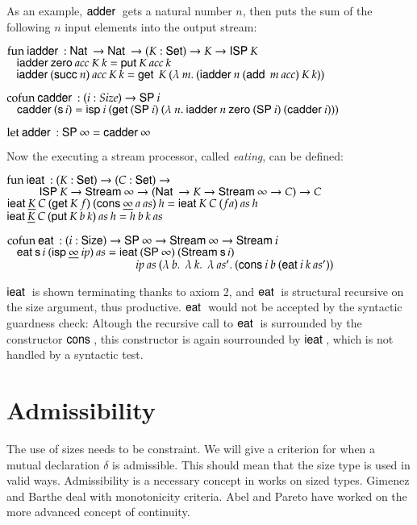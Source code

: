 As an example, $\mathsf{adder}\:$ gets a natural number $n$, 
then puts the sum of the following $n$ input elements into the output stream:
\begin{bsp}
$\mathrm{fun}\: \mathsf{iadder}\: : \mathsf{Nat}\: \rightarrow \mathsf{Nat}\: \rightarrow (K : \mathsf{Set} ) \rightarrow K \rightarrow \mathsf{ISP}\: K$\\
$\hspace*{3mm} \mathsf{iadder}\: \mathsf{zero}\: acc \: K \: k = \mathsf{put}\: K \: acc \: k$\\
$\hspace*{3mm} \mathsf{iadder}\: (\mathsf{succ}\: n) \: acc \: K \: k = \mathsf{get}\: \: K \: (\lambda\: m .\: (\mathsf{iadder}\: n \: (\mathsf{add}\: \: m \: acc) \: K \: k))$

$\mathrm{cofun}\: \mathsf{cadder}\: : (i : Size ) \rightarrow \mathsf{SP}\: i$\\
$\hspace*{3mm} \mathsf{cadder}\: (\mathsf{s}\, i) = \mathsf{isp}\: i \: (\mathsf{get}\: (\mathsf{SP}\: i) \: (\lambda\: n .\: \mathsf{iadder}\: n \: \mathsf{zero}\: (\mathsf{SP}\: i) \: (\mathsf{cadder}\: i)))$

$\mathrm{let}\: \mathsf{adder}\: : \mathsf{SP}\: \infty = \mathsf{cadder}\: \infty$
\end{bsp}
\noindent Now the executing a stream processor, called \emph{eating}, can be defined:
\begin{bsp}
$\mathrm{fun}\: \mathsf{ieat}\: : (K : \mathsf{Set}) \rightarrow (C : \mathsf{Set}) \rightarrow $\\
$ \spcx \ispd K \ra \Stream \infty \ra (\Nat \ra K \ra \Stream \infty \ra C) \ra C$ \\
$ \mathsf{ieat}\: \underline{K} \: C \: (\mathsf{get}\: K \: f) \: (\mathsf{cons}\: \underline{\infty} \: a \: as) \: h = \mathsf{ieat}\: K \: C \: (f a) \: as \: h $ \\
$ \mathsf{ieat}\: \underline{K} \: C \: (\mathsf{put}\: K \: b \:k) \: as  \: h = h \: b \: k \: as $

$\mathrm{cofun}\: \mathsf{eat}\: : (i : \mathsf{Size}) \rightarrow \mathsf{SP}\: \infty \rightarrow \mathsf{Stream}\: \infty \rightarrow \mathsf{Stream}\: i$\\
$\hspace*{3mm} \mathsf{eat}\: \mathsf{s}\, i \: (\mathsf{isp}\: \underline{\infty} \: ip) \: as = \mathsf{ieat}\: (\mathsf{SP}\: \infty) \: (\mathsf{Stream}\: \mathsf{s}\, i)$\\
$\spcx \spcx \spcx  \spcx ip \: as \: (\lam{b} \: \lam{k} \: \lam{as'} (\cons i \: b \: (\eat i \: k \: as'))$   
\end{bsp}
\noindent $\mathsf{ieat}\:$ is shown terminating thanks to axiom 2, 
and $\mathsf{eat}\:$ is structural recursive on the size argument, thus productive.
$\mathsf{eat}\:$ would not be accepted by the syntactic guardness check: Altough the recursive call to $\mathsf{eat}\:$ is surrounded by the constructor $\mathsf{cons}\:$, this constructor is again sourrounded by $\mathsf{ieat}\:$, which is not handled by a syntactic test.
\section{Admissibility}


The use of sizes needs to be constraint.
We will give a criterion for when a mutual declaration $\delta$ is admissible.
This should mean that the size type is used in valid ways.
Admissibility is a necessary concept in works on sized types.
Gimenez and Barthe deal with monotonicity criteria.
Abel and Pareto have worked on the more advanced concept of continuity.

